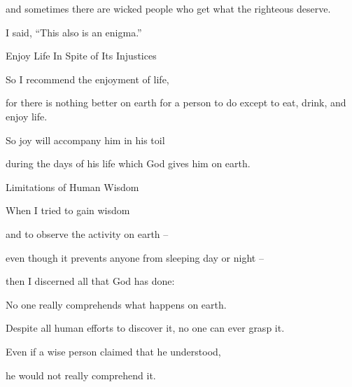 {\par }{\Q and sometimes
there are wicked
people who get
what
the righteous
deserve.

\par }{\Q I said,
“This
also
is an enigma.”
\par }{\SH Enjoy Life In Spite of Its Injustices
\par }{\Q {}So I
recommend
the enjoyment
of life,

\par }{\Q for there is nothing
better
on earth
for
a person
to do except
to eat,
drink,
and enjoy life.
\par }{\Q So joy will accompany
him in his toil
\par }{\Q during the days
of his life
which
God
gives
him on earth.
\par }{\SH Limitations of Human Wisdom
\par }{\Q {}When I tried
to gain
wisdom
\par }{\Q and to observe
the activity
on
earth
–
\par }{\Q even
though
it prevents
anyone from sleeping
day
or night –
\par }{\Q {}then I discerned
all
that God
has done:

\par }{\Q No
one
really comprehends
what happens
on earth.
\par }{\Q Despite
all human
efforts
to discover
it, no
one can ever grasp
it.

\par }{\Q Even
if
a wise person
claimed
that he understood,
\par }{\Q he would
not
really comprehend it.

\par }
